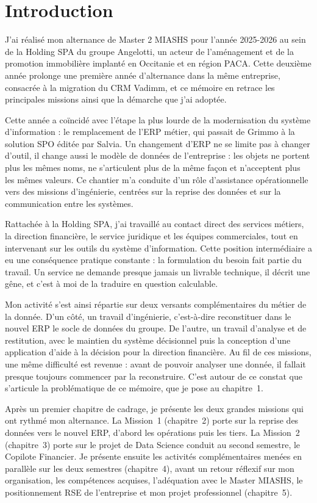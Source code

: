 
\chapter*{Introduction}

J'ai réalisé mon alternance de Master 2 MIASHS pour l'année 2025-2026 au sein de la Holding SPA
du groupe Angelotti, un acteur de l'aménagement et de la promotion immobilière implanté en
Occitanie et en région PACA. Cette deuxième année prolonge une première année d'alternance dans
la même entreprise, consacrée à la migration du CRM Vadimm, et ce mémoire en retrace les
principales missions ainsi que la démarche que j'ai adoptée.

Cette année a coïncidé avec l'étape la plus lourde de la modernisation du système
d'information : le remplacement de l'ERP métier, qui passait de Grimmo à la solution SPO éditée
par Salvia. Un changement d'ERP ne se limite pas à changer d'outil, il change aussi le modèle
de données de l'entreprise : les objets ne portent plus les mêmes noms, ne s'articulent plus de
la même façon et n'acceptent plus les mêmes valeurs. Ce chantier m'a conduite d'un rôle
d'assistance opérationnelle vers des missions d'ingénierie, centrées sur la reprise des données
et sur la communication entre les systèmes.

Rattachée à la Holding SPA, j'ai travaillé au contact direct des services métiers, la direction
financière, le service juridique et les équipes commerciales, tout en intervenant sur les
outils du système d'information. Cette position intermédiaire a eu une conséquence pratique
constante : la formulation du besoin fait partie du travail. Un service ne demande presque
jamais un livrable technique, il décrit une gêne, et c'est à moi de la traduire en question
calculable.

Mon activité s'est ainsi répartie sur deux versants complémentaires du métier de la donnée.
D'un côté, un travail d'ingénierie, c'est-à-dire reconstituer dans le nouvel ERP le socle de
données du groupe. De l'autre, un travail d'analyse et de restitution, avec le maintien du
système décisionnel puis la conception d'une application d'aide à la décision pour la direction
financière. Au fil de ces missions, une même difficulté est revenue : avant de pouvoir analyser
une donnée, il fallait presque toujours commencer par la reconstruire. C'est autour de ce
constat que s'articule la problématique de ce mémoire, que je pose au chapitre~1.

Après un premier chapitre de cadrage, je présente les deux grandes missions qui ont rythmé mon
alternance. La Mission~1 (chapitre~2) porte sur la reprise des données vers le nouvel ERP,
d'abord les opérations puis les tiers. La Mission~2 (chapitre~3) porte sur le projet de Data
Science conduit au second semestre, le Copilote Financier. Je présente ensuite les activités
complémentaires menées en parallèle sur les deux semestres (chapitre~4), avant un retour
réflexif sur mon organisation, les compétences acquises, l'adéquation avec le Master MIASHS, le
positionnement RSE de l'entreprise et mon projet professionnel (chapitre~5).
